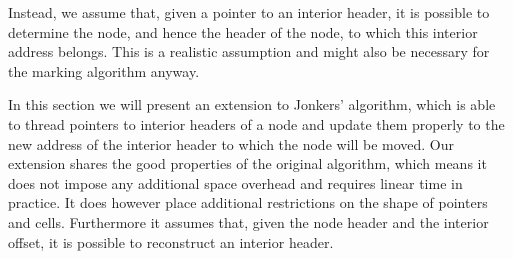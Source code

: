 \documentclass[10pt,a4paper,final,twocolumn]{article}
\begin{document}
Instead, we assume that, given a pointer to an interior header, it is possible to determine the
node, and hence the header of the node, to which this interior address belongs. This is a
realistic assumption and might also be necessary for the marking algorithm anyway.

In this section we will present an extension to Jonkers' algorithm, which is able to thread
pointers to interior headers of a node and update them properly to the new address of the
interior header to which the node will be moved. Our extension shares the good properties
of the original algorithm, which means it does not impose any additional space overhead
and requires linear time in practice.
It does however place additional restrictions on the shape of pointers and cells. Furthermore
it assumes that, given the node header and the interior offset, it is possible to reconstruct
an interior header.
\end{document}
